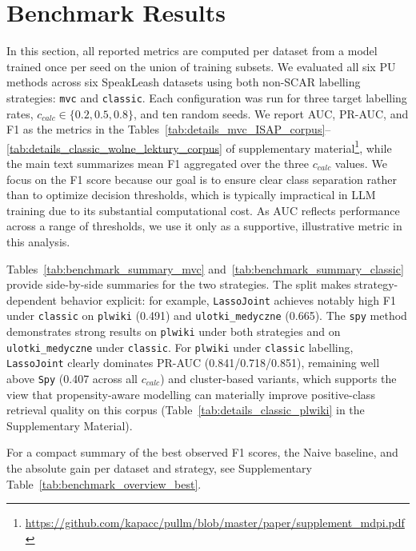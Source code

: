 \documentclass[applsci,article,submit,pdftex,moreauthors]{Definitions/mdpi}
\begin{document}
\section{Benchmark Results}
In this section, all reported metrics are computed per dataset from a model trained once per seed on the union of training subsets. We evaluated all six PU methods across six SpeakLeash datasets using both non-SCAR labelling strategies: \texttt{mvc} and \texttt{classic}. Each configuration was run for three target labelling rates, $c_{calc} \in \{0.2, 0.5, 0.8\}$, and ten random seeds. We report AUC, PR-AUC, and F1 as the metrics in the Tables~\ref{tab:details_mvc_ISAP_corpus}--\ref{tab:details_classic_wolne_lektury_corpus} of supplementary material\footnote{\url{https://github.com/kapacc/pullm/blob/master/paper/supplement_mdpi.pdf}}, while the main text summarizes mean F1 aggregated over the three $c_{calc}$ values. We focus on the F1 score because our goal is to ensure clear class separation rather than to optimize decision thresholds, which is typically impractical in LLM training due to its substantial computational cost. As AUC reflects performance across a range of thresholds, we use it only as a supportive, illustrative metric in this analysis.

Tables~\ref{tab:benchmark_summary_mvc} and~\ref{tab:benchmark_summary_classic} provide side-by-side summaries for the two strategies. The split makes strategy-dependent behavior explicit: for example, \texttt{LassoJoint} achieves notably high F1 under \texttt{classic} on \texttt{plwiki} (0.491) and \texttt{ulotki\_medyczne} (0.665). The \texttt{spy} method demonstrates strong results on \texttt{plwiki} under both strategies and on \texttt{ulotki\_medyczne} under \texttt{classic}. For \texttt{plwiki} under \texttt{classic} labelling, \texttt{LassoJoint} clearly dominates PR-AUC (0.841/0.718/0.851), remaining well above \texttt{Spy} (0.407 across all $c_{calc}$) and cluster-based variants, which supports the view that propensity-aware modelling can materially improve positive-class retrieval quality on this corpus (Table~\ref{tab:details_classic_plwiki} in the Supplementary Material).

For a compact summary of the best observed F1 scores, the Naive baseline, and the absolute gain per dataset and strategy, see Supplementary Table~\ref{tab:benchmark_overview_best}.
\end{document}
